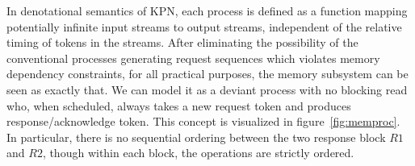 In denotational semantics of KPN, each process is defined as a function mapping potentially infinite input streams to output streams, independent of the relative timing
of tokens in the streams.
After eliminating the possibility of the conventional
processes generating request sequences which violates memory dependency constraints, for all practical purposes, the memory subsystem can be seen as exactly that. 
We can 
model it as a deviant process with no blocking read who, when scheduled, always takes a new request token and produces response/acknowledge token. This concept is visualized in figure~\ref{fig:memproc}. In particular, there is no sequential
ordering between the two response block $R1$ and $R2$, though within each block,
the operations are strictly ordered.







%


